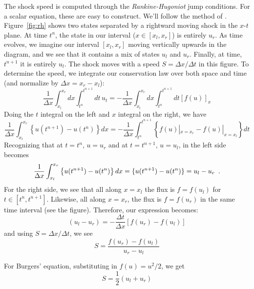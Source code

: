 The shock speed is computed through the {\em Rankine-Hugoniot} jump
conditions.  For a scalar equation, these are easy to construct.
We'll follow the method of \cite{leveque:2002}.  Figure~\ref{fig:rh}
shows two states separated by a rightward moving shock in the $x$-$t$
plane.  At time $t^n$, the state in our interval ($x \in [x_l,x_r]$)
is entirely $u_r$.  As time evolves, we imagine our interval $[x_l,x_r]$ moving
vertically upwards in the diagram, and we see that it contains a mix of states $u_l$ and $u_r$.  Finally, at time, $t^{n+1}$ it is entirely
$u_l$.  The shock moves with a speed $S = \Delta x/\Delta t$ in this
figure.  To determine the speed, we integrate our conservation law over
both space and time (and normalize by $\Delta x = x_r - x_l$):
\begin{equation}
\frac{1}{\Delta x} \int_{x_l}^{x_r} dx \int_{t^n}^{t^{n+1}} dt\, u_t =
  - \frac{1}{\Delta x} \int_{x_l}^{x_r} dx \int_{t^n}^{t^{n+1}} dt \left [ f(u) \right ]_x
\end{equation}
Doing the $t$ integral on the left and $x$ integral on the right, we have
\begin{equation}
\frac{1}{\Delta x} \int_{x_l}^{x_r}\left \{ u(t^{n+1}) - u(t^n) \right \} dx =
  - \frac{1}{\Delta x} \int_{t^n}^{t^{n+1}} \left \{ f(u) |_{x=x_r} - f(u) |_{x=x_l} \right \} dt
\end{equation}
Recognizing that at $t=t^n$, $u = u_r$ and at $t=t^{n+1}$, $u = u_l$,
in the left side becomes
\begin{equation}
\frac{1}{\Delta x} \int_{x_l}^{x_r}\left \{ u(t^{n+1}) - u(t^n) \right \} dx = \{ u(t^{n+1}) - u(t^n) \} =  u_l -u_r \enskip .
\end{equation}
For the right side, we see that all along $x=x_l$ the flux is $f =
f(u_l)$ for $t\in [t^n, t^{n+1}]$.  Likewise, all along $x=x_r$, the
flux is $f = f(u_r)$ in the same time interval (see the figure).
Therefore, our expression becomes:
\begin{equation}
(u_l - u_r) = -\frac{\Delta t}{\Delta x} \left [ f(u_r) - f(u_l)\right ]
\end{equation}
and using $S = \Delta x/\Delta t$, we see
\begin{equation}
S = \frac{f(u_r) - f(u_l)}{u_r - u_l}
\end{equation}

For Burgers' equation, substituting in $f(u) = u^2/2$, we get
\begin{equation}
S = \frac{1}{2}(u_l + u_r)
\end{equation}

